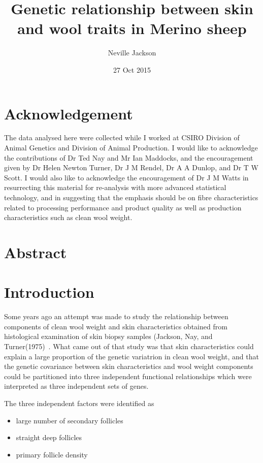 \documentclass[titlepage]{article}  %
\title{ Genetic relationship between skin and wool traits in Merino sheep}
\author{Neville Jackson }
\date{27 Oct 2015}
\begin{document}
 
 
\maketitle      
\tableofcontents

\clearpage
\section{Acknowledgement}
The data analysed here were collected while I worked at CSIRO Division of Animal Genetics and Division of Animal Production. I would like to acknowledge the contributions of Dr Ted Nay and Mr Ian Maddocks, and the encouragement given by Dr Helen Newton Turner, Dr J M Rendel, Dr A A Dunlop, and Dr T W Scott. I would also like to acknowledge the encouragement of Dr J M Watts in resurrecting this material for re-analysis with more advanced statistical technology, and in suggesting that the emphasis should be on fibre characteristics related to processing performance and product quality as well as production characteristics such as clean wool weight.


\clearpage
\section{Abstract}

\clearpage
\section{Introduction} 
	Some years ago an attempt was made to study the relationship between components of clean wool weight and skin characteristics obtained from histological examination of skin biopsy samples (Jackson, Nay, and Turner(1975)~\cite{jack:75}. What came out of that study was that skin characteristics could explain a large proportion of the genetic variatrion in clean wool weight, and that the genetic covariance between skin characteristics and wool weight components could be partitioned into three independent functional relationships which were interpreted as three independent sets of genes.

	The three independent factors were identified as 
\begin{itemize}
\item large number of secondary follicles
\item straight deep follicles
\item primary follicle density
\end{itemize}
\end{document}
